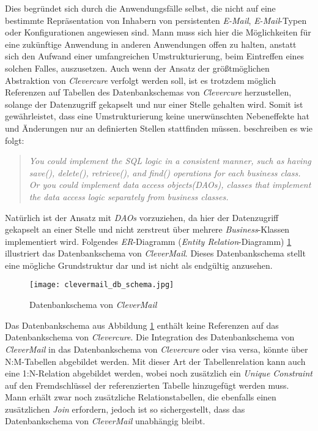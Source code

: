 \newline
\newline
Dies begründet sich durch die Anwendungsfälle selbst, die nicht auf eine bestimmte Repräsentation von Inhabern von persistenten \emph{E-Mail}, \emph{E-Mail}-Typen oder Konfigurationen angewiesen sind. Mann muss sich hier die Möglichkeiten für eine zukünftige Anwendung in anderen Anwendungen offen zu halten, anstatt sich den Aufwand einer umfangreichen Umstrukturierung, beim Eintreffen eines solchen Falles, auszusetzen. 
\newline
\newline
Auch wenn der Ansatz der größtmöglichen Abstraktion von \emph{Clevercure} verfolgt werden soll, ist es trotzdem möglich Referenzen auf Tabellen des Datenbankschemas von \emph{Clevercure} herzustellen, solange der Datenzugriff gekapselt und nur einer Stelle gehalten wird. Somit ist gewährleistet, dass eine Umstrukturierung keine unerwünschten Nebeneffekte hat und Änderungen nur an definierten Stellen stattfinden müssen. \cite[66]{refactoreDatabase} beschreiben es wie folgt:
\begin{quote}
\emph{You could implement the SQL logic in a consistent manner, such as having save(), delete(), retrieve(), and find() operations for each business class. Or you could implement data access objects(DAOs), classes that implement the data access logic separately from business classes.}
\end{quote}
Natürlich ist der Ansatz mit \emph{DAOs} vorzuziehen, da hier der Datenzugriff gekapselt an einer Stelle und nicht zerstreut über mehrere \emph{Business}-Klassen implementiert wird.
\newpage
Folgendes \emph{ER}-Diagramm (\emph{Entity Relation}-Diagramm) \ref{fig:clevermail-db-schema} illustriert das Datenbankschema von \emph{CleverMail}. Dieses Datenbankschema stellt eine mögliche Grundstruktur dar und ist nicht als endgültig anzusehen.
\begin{figure}[H]
\centering
\texttt{[image: clevermail\_db\_schema.jpg]}
\caption{Datenbankschema von \emph{CleverMail}}
\label{fig:clevermail-db-schema}
\end{figure}
Das Datenbankschema aus Abbildung \ref{fig:clevermail-db-schema} enthält keine Referenzen auf das Datenbankschema von \emph{Clevercure}. Die Integration des Datenbankschema von \emph{CleverMail} in das Datenbankschema von \emph{Clevercure} oder visa versa, könnte über N:M-Tabellen abgebildet werden. Mit dieser Art der Tabellenrelation kann auch eine 1:N-Relation abgebildet werden, wobei noch zusätzlich ein \emph{Unique Constraint} auf den Fremdschlüssel der referenzierten Tabelle hinzugefügt werden muss. Mann erhält zwar noch zusätzliche Relationstabellen, die ebenfalls einen zusätzlichen \emph{Join} erfordern, jedoch ist so sichergestellt, dass das Datenbankschema von \emph{CleverMail} unabhängig bleibt.
